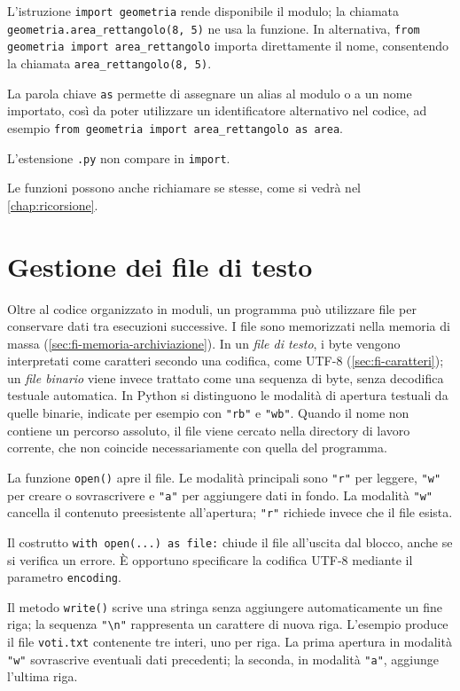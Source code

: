 L'istruzione \texttt{import geometria} rende disponibile il modulo;
la chiamata \texttt{geometria.area\_rettangolo(8, 5)} ne usa la funzione.
In alternativa, \lstinline|from geometria import area_rettangolo|
importa direttamente il nome, consentendo la chiamata
\lstinline|area_rettangolo(8, 5)|.

La parola chiave \texttt{as}
permette di assegnare un alias al modulo o a un nome importato,
così da poter utilizzare un identificatore alternativo nel codice,
ad esempio \lstinline|from geometria import area_rettangolo as area|.

L'estensione \texttt{.py} non compare in \texttt{import}.

Le funzioni possono anche richiamare se stesse, come si vedrà
nel \cref{chap:ricorsione}.

\section{Gestione dei file di testo}
\label{sec:fi-python-file}

Oltre al codice organizzato in moduli, un programma può utilizzare file
per conservare dati tra esecuzioni successive. I file sono memorizzati
nella memoria di massa (\cref{sec:fi-memoria-archiviazione}). In un
\emph{file di testo}, i byte vengono interpretati come caratteri
secondo una codifica, come UTF-8 (\cref{sec:fi-caratteri}); un
\emph{file binario} viene invece trattato come una sequenza di byte,
senza decodifica testuale automatica. In Python si distinguono le modalità
di apertura testuali da quelle binarie, indicate per esempio con
\lstinline|"rb"| e \lstinline|"wb"|.
Quando il nome non contiene un percorso assoluto, il file viene
cercato nella directory di lavoro corrente,
che non coincide necessariamente con quella del programma.

La funzione \texttt{open()} apre il file. Le modalità principali sono
\lstinline|"r"| per leggere, \lstinline|"w"| per creare o sovrascrivere
e \lstinline|"a"| per aggiungere dati in fondo. La modalità
\lstinline|"w"| cancella il contenuto preesistente all'apertura;
\lstinline|"r"| richiede invece che il file esista.

Il costrutto \texttt{with open(...) as file:} chiude il file
all'uscita dal blocco, anche se si verifica un errore. È opportuno
specificare la codifica UTF-8 mediante il parametro \texttt{encoding}.



Il metodo \texttt{write()} scrive una stringa senza aggiungere
automaticamente un fine riga; la sequenza \lstinline|"\n"| rappresenta
un carattere di nuova riga. L'esempio produce il file \texttt{voti.txt}
contenente tre interi, uno per riga. La prima apertura in modalità
\lstinline|"w"| sovrascrive eventuali dati precedenti; la seconda,
in modalità \lstinline|"a"|, aggiunge l'ultima riga.

